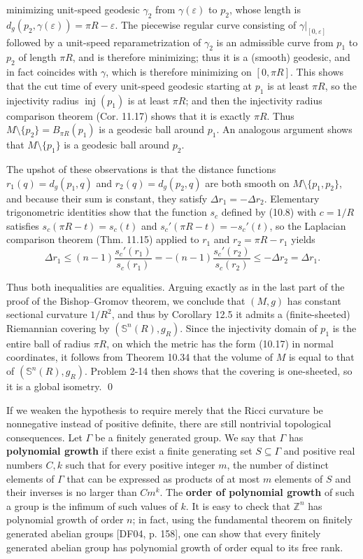 minimizing unit-speed geodesic $\gamma_2$ from $\gamma(\varepsilon)$ to $p_2$, whose length is $d_g(p_2, \gamma(\varepsilon)) = \pi R - \varepsilon$. The piecewise regular curve consisting of $\gamma|_{[0,\varepsilon]}$ followed by a unit-speed reparametrization of $\gamma_2$ is an admissible curve from $p_1$ to $p_2$ of length $\pi R$, and is therefore minimizing; thus it is a (smooth) geodesic, and in fact coincides with $\gamma$, which is therefore minimizing on $[0, \pi R]$. This shows that the cut time of every unit-speed geodesic starting at $p_1$ is at least $\pi R$, so the injectivity radius $\operatorname{inj}(p_1)$ is at least $\pi R$; and then the injectivity radius comparison theorem (Cor. 11.17) shows that it is exactly $\pi R$. Thus $M \setminus \{p_2\} = B_{\pi R}(p_1)$ is a geodesic ball around $p_1$. An analogous argument shows that $M \setminus \{p_1\}$ is a geodesic ball around $p_2$.

The upshot of these observations is that the distance functions $r_1(q) = d_g(p_1, q)$ and $r_2(q) = d_g(p_2, q)$ are both smooth on $M \setminus \{p_1, p_2\}$, and because their sum is constant, they satisfy $\Delta r_1 = -\Delta r_2$. Elementary trigonometric identities show that the function $s_c$ defined by (10.8) with $c = 1/R$ satisfies $s_c(\pi R - t) = s_c(t)$ and $s_c'(\pi R - t) = -s_c'(t)$, so the Laplacian comparison theorem (Thm. 11.15) applied to $r_1$ and $r_2 = \pi R - r_1$ yields
\[
\Delta r_1 \le (n-1) \frac{s_c'(r_1)}{s_c(r_1)} = -(n-1) \frac{s_c'(r_2)}{s_c(r_2)} \le -\Delta r_2 = \Delta r_1.
\]

Thus both inequalities are equalities. Arguing exactly as in the last part of the proof of the Bishop--Gromov theorem, we conclude that $(M, g)$ has constant sectional curvature $1/R^2$, and thus by Corollary 12.5 it admits a (finite-sheeted) Riemannian covering by $(\mathbb{S}^n(R), g_R)$. Since the injectivity domain of $p_1$ is the entire ball of radius $\pi R$, on which the metric has the form (10.17) in normal coordinates, it follows from Theorem 10.34 that the volume of $M$ is equal to that of $(\mathbb{S}^n(R), g_R)$. Problem 2-14 then shows that the covering is one-sheeted, so it is a global isometry. \qed

If we weaken the hypothesis to require merely that the Ricci curvature be nonnegative instead of positive definite, there are still nontrivial topological consequences. Let $\Gamma$ be a finitely generated group. We say that $\Gamma$ has \textbf{polynomial growth} if there exist a finite generating set $S \subseteq \Gamma$ and positive real numbers $C, k$ such that for every positive integer $m$, the number of distinct elements of $\Gamma$ that can be expressed as products of at most $m$ elements of $S$ and their inverses is no larger than $Cm^k$. The \textbf{order of polynomial growth} of such a group is the infimum of such values of $k$. It is easy to check that $\mathbb{Z}^n$ has polynomial growth of order $n$; in fact, using the fundamental theorem on finitely generated abelian groups [DF04, p. 158], one can show that every finitely generated abelian group has polynomial growth of order equal to its free rank.

